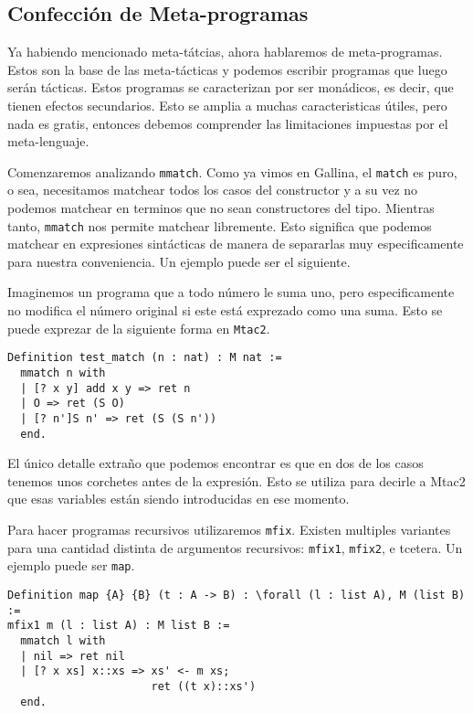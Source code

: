 \subsection{Confección de Meta-programas}
Ya habiendo mencionado meta-tátcias, ahora hablaremos de meta-programas. Estos son la base de las meta-tácticas y podemos escribir programas que luego serán tácticas. Estos programas se caracterizan por ser monádicos, es decir, que tienen efectos secundarios. Esto se amplia a muchas caracteristicas útiles, pero nada es gratis, entonces debemos comprender las limitaciones impuestas por el meta-lenguaje.

Comenzaremos analizando \lstinline{mmatch}. Como ya vimos en Gallina, el \lstinline{match} es puro, o sea, necesitamos matchear todos los casos del constructor y a su vez no podemos matchear en terminos que no sean constructores del tipo. Mientras tanto, \lstinline{mmatch} nos permite matchear libremente. Esto significa que podemos matchear en expresiones sintácticas de manera de separarlas muy especificamente para nuestra conveniencia. Un ejemplo puede ser el siguiente.

Imaginemos un programa que a todo número le suma uno, pero especificamente no modifica el número original si este está exprezado como una suma. Esto se puede exprezar de la siguiente forma en \lstinline{Mtac2}.
\begin{lstlisting}
Definition test_match (n : nat) : M nat :=
  mmatch n with
  | [? x y] add x y => ret n
  | O => ret (S O)
  | [? n']S n' => ret (S (S n'))
  end.
\end{lstlisting}

El único detalle extraño que podemos encontrar es que en dos de los casos tenemos unos corchetes antes de la expresión. Esto se utiliza para decirle a Mtac2 que esas variables están siendo introducidas en ese momento.

Para hacer programas recursivos utilizaremos \lstinline{mfix}. Existen multiples variantes para una cantidad distinta de argumentos recursivos: \lstinline{mfix1}, \lstinline{mfix2}, e
tcetera.
Un ejemplo puede ser \lstinline{map}.
\begin{lstlisting}
Definition map {A} {B} (t : A -> B) : \forall (l : list A), M (list B) :=
mfix1 m (l : list A) : M list B :=
  mmatch l with
  | nil => ret nil
  | [? x xs] x::xs => xs' <- m xs;
                      ret ((t x)::xs')
  end.
\end{lstlisting}

